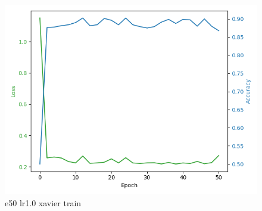 \documentclass[8pt]{article}
\begin{document}
\begin{figure}[H]
    \begin{minipage}{0.32\textwidth}
        \centering
        \includegraphics[width=\textwidth]{../Prob4/out/1024_173617/e50_lr1_btz16_xavier/training_process.png}
        \caption{e50 lr1.0 xavier train}
        \label{fig:e50 lr1.0 xavier train}
    \end{minipage}
\end{figure}
\end{document}
